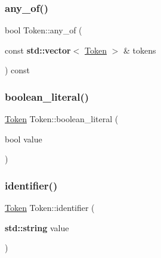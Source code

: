 \subsubsection{\texorpdfstring{any\+\_\+of()}{any\_of()}}
{\footnotesize\ttfamily bool Token\+::any\+\_\+of (\begin{DoxyParamCaption}\item[{const \textbf{ std\+::vector}$<$ \hyperlink{class_token}{Token} $>$ \&}]{tokens }\end{DoxyParamCaption}) const\hspace{0.3cm}{\ttfamily [inline]}}

\mbox{\label{class_token_a95cc3830383b9cfb05ae2b29ca776c41}} 
\subsubsection{\texorpdfstring{boolean\+\_\+literal()}{boolean\_literal()}}
{\footnotesize\ttfamily \hyperlink{class_token}{Token} Token\+::boolean\+\_\+literal (\begin{DoxyParamCaption}\item[{bool}]{value }\end{DoxyParamCaption})\hspace{0.3cm}{\ttfamily [static]}}

\mbox{\label{class_token_a15dc839f68c100e6041c7ca089ea9005}} 
\subsubsection{\texorpdfstring{identifier()}{identifier()}\hspace{0.1cm}{\footnotesize\ttfamily [1/2]}}
{\footnotesize\ttfamily \hyperlink{class_token}{Token} Token\+::identifier (\begin{DoxyParamCaption}\item[{\textbf{ std\+::string}}]{value }\end{DoxyParamCaption})\hspace{0.3cm}{\ttfamily [static]}}

\mbox{\label{class_token_a6233a8babfc11fbf5ad709d812c23bfd}} 
